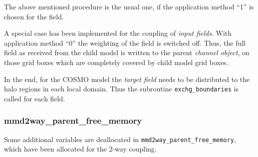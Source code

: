 \documentclass[11pt,twoside]{article}
\begin{document}
The above mentioned procedure is the usual one, if the application method ``1''
is chosen for the field.\label{descript:appl}

A special case has been implemented for the coupling of {\it input fields}. With
application method ``0'' the weighting of the field is switched off. Thus, the
full  field as received from the child model is written to the parent {\it 
channel object}, on those grid boxes which are completely covered by child
model grid boxes.

In the end, for the COSMO model the {\it target field}
 needs to be distributed to
the halo regions in each local domain. Thus the subroutine 
\verb|exchg_boundaries| is called for each field.


\subsubsection{mmd2way\_parent\_free\_memory}
Some additional variables are deallocated
in \verb|mmd2way_parent_free_memory|,
which have been allocated for the 2-way coupling.
\end{document}
